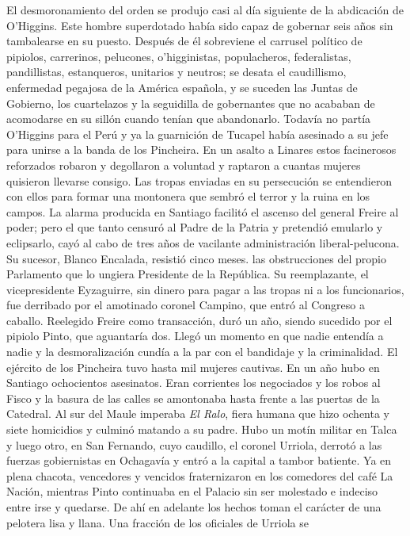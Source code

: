 \documentclass[10pt,twoside,openright]{memoir}
\begin{document}
El desmoronamiento del orden se produjo casi al día siguiente de la
abdicación de O'Higgins. Este hombre superdotado había sido capaz de
gobernar seis años sin tambalearse en su puesto. Después de él
sobreviene el carrusel político de pipiolos, carrerinos, pelucones,
o'higginistas, populacheros, federalistas, pandillistas, estanqueros,
unitarios y neutros; se desata el caudillismo, enfermedad pegajosa de la
América española, y se suceden las Juntas de Gobierno, los cuartelazos y
la seguidilla de gobernantes que no acababan de acomodarse en su sillón
cuando tenían que abandonarlo. Todavía no partía O'Higgins para el Perú
y ya la guarnición de Tucapel había asesinado a su jefe para unirse a la
banda de los Pincheira. En un asalto a Linares estos facinerosos
reforzados robaron y degollaron a voluntad y raptaron a cuantas mujeres
quisieron llevarse consigo. Las tropas enviadas en su persecución se
entendieron con ellos para formar una montonera que sembró el terror y
la ruina en los campos. La alarma producida en Santiago facilitó el
ascenso del general Freire al poder; pero el que tanto censuró al Padre
de la Patria y pretendió emularlo y eclipsarlo, cayó al cabo de tres
años de vacilante administración liberal-pelucona. Su sucesor, Blanco
Encalada, resistió cinco meses. las obstrucciones del propio Parlamento
que lo ungiera Presidente de la República. Su reemplazante, el
vicepresidente Eyzaguirre, sin dinero para pagar a las tropas ni a los
funcionarios, fue derribado por el amotinado coronel Campino, que entró
al Congreso a caballo. Reelegido Freire como transacción, duró un año,
siendo sucedido por el pipiolo Pinto, que aguantaría dos. Llegó un
momento en que nadie entendía a nadie y la desmoralización cundía a la
par con el bandidaje y la criminalidad. El ejército de los Pincheira
tuvo hasta mil mujeres cautivas. En un año hubo en Santiago ochocientos
asesinatos. Eran corrientes los negociados y los robos al Fisco y la
basura de las calles se amontonaba hasta frente a las puertas de la
Catedral. Al sur del Maule imperaba \emph{El Ralo}, fiera humana que hizo
ochenta y siete homicidios y culminó matando a su padre. Hubo un motín
militar en Talca y luego otro, en San Fernando, cuyo caudillo, el
coronel Urriola, derrotó a las fuerzas gobiernistas en Ochagavía y entró
a la capital a tambor batiente. Ya en plena chacota, vencedores y
vencidos fraternizaron en los comedores del café La Nación, mientras
Pinto continuaba en el Palacio sin ser molestado e indeciso entre irse y
quedarse. De ahí en adelante los hechos toman el carácter de una
pelotera lisa y llana. Una fracción de los oficiales de Urriola se
\end{document}
